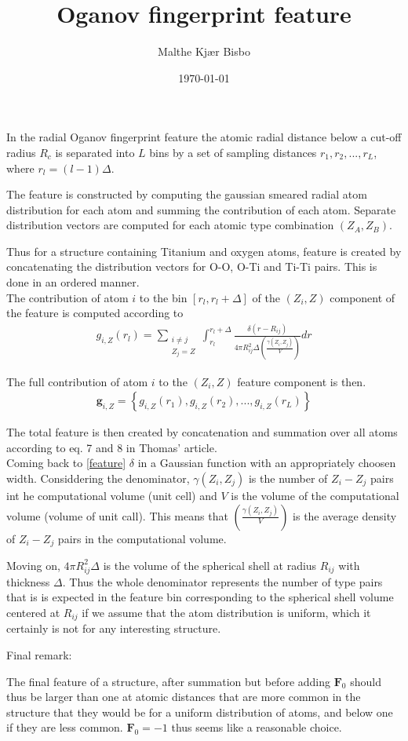 \documentclass[english,a4paper,oneside, onecolumn,article,9pt]{memoir}
\title{Oganov fingerprint feature}
\author{Malthe Kjær Bisbo}
\date{\today}
\newcommand{\mb}[1]{\mathbf{#1}}
\begin{document}
\thispagestyle{empty}
\maketitle

In the radial Oganov fingerprint feature the atomic radial distance below a cut-off radius $R_c$ is separated into $L$ bins by a set of sampling distances ${r_1, r_2,...,r_L}$, where $r_l = (l-1)\Delta$.

The feature is constructed by computing the gaussian smeared radial atom distribution for each atom and summing the contribution of each atom. Separate distribution vectors are computed for each atomic type combination $(Z_A, Z_B)$. 

Thus for a structure containing Titanium and oxygen atoms, feature is created by concatenating the distribution vectors for O-O, O-Ti and Ti-Ti pairs. This is done in an ordered manner. \\

The contribution of atom $i$ to the bin $[r_l, r_l+\Delta]$ of the $(Z_i, Z)$ component of the feature is computed according to 
\begin{align}
g_{i,Z}(r_l) = \sum_{\substack{i\neq j \\ Z_j=Z}}\int_{r_l}^{r_l+\Delta} \frac{\delta(r-R_{ij})}{4\pi R_{ij}^2\Delta \left(\frac{\gamma(Z_i,Z_j)}{V}\right)}dr
\label{feature}
\end{align}

The full contribution of atom $i$ to the $(Z_i, Z)$ feature component is then.
\begin{align}
\mb{g}_{i,Z} = \left\{g_{i,Z}(r_1), g_{i,Z}(r_2), ... , g_{i,Z}(r_L)\right\}
\end{align}

The total feature is then created by concatenation and summation over all atoms according to eq. 7 and 8 in Thomas' article. \\

Coming back to \ref{feature} $\delta$ in a Gaussian function with an appropriately choosen width. Considdering the denominator, $\gamma(Z_i,Z_j)$ is the number of $Z_i-Z_j$ pairs int he computational volume (unit cell) and $V$ is the volume of the computational volume (volume of unit call). This means that $\left(\frac{\gamma(Z_i,Z_j)}{V}\right)$ is the average density of $Z_i-Z_j$ pairs in the computational volume.

Moving on,  $4\pi R_{ij}^2\Delta$ is the volume of the spherical shell at radius $R_{ij}$ with thickness $\Delta$. Thus the whole denominator represents the number of type pairs that is is expected in the feature bin corresponding to the spherical shell volume centered at $R_{ij}$ if we assume that the atom distribution is uniform, which it certainly is not for any interesting structure.

Final remark:

The final feature of a structure, after summation but before adding $\mb{F}_0$ should thus be larger than one at atomic distances that are more common in the structure that they would be for a uniform distribution of atoms, and below one if they are less common.
$\mb{F}_0 = -1$ thus seems like a reasonable choice.
\end{document}
